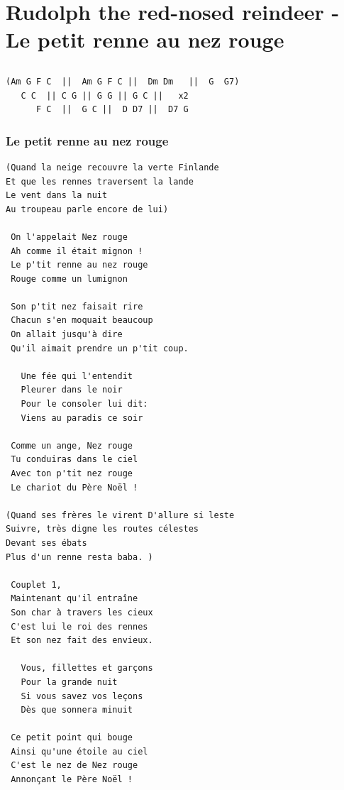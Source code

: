 \documentclass[
]{article}
\begin{document}
\hypertarget{rudolph-the-red-nosed-reindeer---le-petit-renne-au-nez-rouge}{%
\section{Rudolph the red-nosed reindeer - Le petit renne au nez
rouge}\label{rudolph-the-red-nosed-reindeer---le-petit-renne-au-nez-rouge}}

\hypertarget{section-10}{%
\subsection*{}\label{section-10}}

\begin{verbatim}
(Am G F C  ||  Am G F C ||  Dm Dm   ||  G  G7)
   C C  || C G || G G || G C ||   x2
      F C  ||  G C ||  D D7 ||  D7 G 
\end{verbatim}

\hypertarget{le-petit-renne-au-nez-rouge}{%
\subsubsection*{Le petit renne au nez
rouge}\label{le-petit-renne-au-nez-rouge}}

\begin{verbatim}
(Quand la neige recouvre la verte Finlande 
Et que les rennes traversent la lande 
Le vent dans la nuit 
Au troupeau parle encore de lui) 

 On l'appelait Nez rouge
 Ah comme il était mignon !
 Le p'tit renne au nez rouge
 Rouge comme un lumignon

 Son p'tit nez faisait rire
 Chacun s'en moquait beaucoup
 On allait jusqu'à dire
 Qu'il aimait prendre un p'tit coup.
 
   Une fée qui l'entendit 
   Pleurer dans le noir
   Pour le consoler lui dit:
   Viens au paradis ce soir

 Comme un ange, Nez rouge
 Tu conduiras dans le ciel
 Avec ton p'tit nez rouge
 Le chariot du Père Noël !  
 
(Quand ses frères le virent D'allure si leste
Suivre, très digne les routes célestes
Devant ses ébats
Plus d'un renne resta baba. )
 
 Couplet 1,
 Maintenant qu'il entraîne
 Son char à travers les cieux
 C'est lui le roi des rennes
 Et son nez fait des envieux. 

   Vous, fillettes et garçons
   Pour la grande nuit
   Si vous savez vos leçons
   Dès que sonnera minuit
 
 Ce petit point qui bouge
 Ainsi qu'une étoile au ciel
 C'est le nez de Nez rouge
 Annonçant le Père Noël ! 
\end{verbatim}
\end{document}
